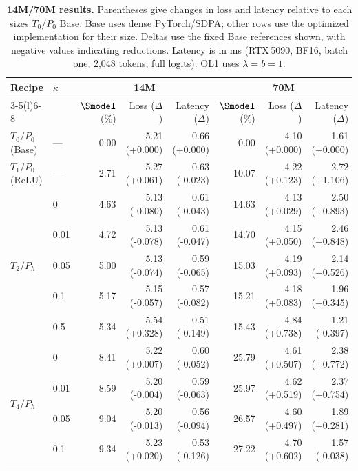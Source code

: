 \begin{table}[!htbp]
\centering\footnotesize
\setlength{\tabcolsep}{2pt}
\renewcommand{\arraystretch}{1.12}
\caption{\textbf{14M/70M results.} Parentheses give changes in loss and latency relative to each size\textquotesingle s $T_0/P_0$ Base. Base uses dense PyTorch/SDPA; other rows use the optimized implementation for their size. Deltas use the fixed Base references shown, with negative values indicating reductions. Latency is in ms (RTX\,5090, BF16, batch one, 2,048 tokens, full logits). OL1 uses $\lambda=b=1$.}
\label{tab:endpoints-14m-70m}
\begin{tabular}{@{}llrrrrrr@{}}
\toprule
\multirow{2}{*}{Recipe} & \multirow{2}{*}{$\kappa$} & \multicolumn{3}{c}{14M} & \multicolumn{3}{c}{70M} \\
\cmidrule(lr){3-5}\cmidrule(l){6-8}
 & & $\Smodel$ (\%) & Loss ($\Delta$) & Latency ($\Delta$) & $\Smodel$ (\%) & Loss ($\Delta$) & Latency ($\Delta$) \\
\midrule
$T_0/P_0$ (Base) & --- & 0.00 & 5.21 (+0.000) & 0.66 (+0.000) & 0.00 & 4.10 (+0.000) & 1.61 (+0.000) \\
\midrule
$T_1/P_0$ (ReLU) & --- & 2.71 & 5.27 (+0.061) & 0.63 (-0.023) & 10.07 & 4.22 (+0.123) & 2.72 (+1.106) \\
\midrule
\multirow{5}{*}{$T_2/P_{h}$} & 0 & 4.63 & 5.13 (-0.080) & 0.61 (-0.043) & 14.63 & 4.13 (+0.029) & 2.50 (+0.893) \\
 & 0.01 & 4.72 & 5.13 (-0.078) & 0.61 (-0.047) & 14.70 & 4.15 (+0.050) & 2.46 (+0.848) \\
 & 0.05 & 5.00 & 5.13 (-0.074) & 0.59 (-0.065) & 15.03 & 4.19 (+0.093) & 2.14 (+0.526) \\
 & 0.1 & 5.17 & 5.15 (-0.057) & 0.57 (-0.082) & 15.21 & 4.18 (+0.083) & 1.96 (+0.345) \\
 & 0.5 & 5.34 & 5.54 (+0.328) & 0.51 (-0.149) & 15.43 & 4.84 (+0.738) & 1.21 (-0.397) \\
\midrule
\multirow{5}{*}{$T_4/P_{h}$} & 0 & 8.41 & 5.22 (+0.007) & 0.60 (-0.052) & 25.79 & 4.61 (+0.507) & 2.38 (+0.772) \\
 & 0.01 & 8.59 & 5.20 (-0.004) & 0.59 (-0.063) & 25.97 & 4.62 (+0.519) & 2.37 (+0.754) \\
 & 0.05 & 9.04 & 5.20 (-0.013) & 0.56 (-0.094) & 26.57 & 4.60 (+0.497) & 1.89 (+0.281) \\
 & 0.1 & 9.34 & 5.23 (+0.020) & 0.53 (-0.126) & 27.22 & 4.70 (+0.602) & 1.57 (-0.038) \\

\end{tabular}
\end{table}
